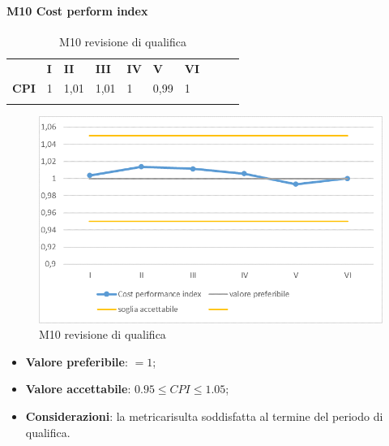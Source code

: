 \paragraph{M10 Cost perform index} \mbox{}
\begin{longtable}[H!] {						
		>{}p{50mm}  		
		>{}p{8mm}
		>{}p{8mm}		
		>{}p{8mm}		
		>{}p{8mm}		
		>{}p{8mm}		
		>{}p{8mm}
		>{}p{8mm}
		>{}p{8mm}
		>{}p{8mm}
	}
	\rowcolor{gray!50}
	\textbf{} & \textbf{I} & \textbf{II} & \textbf{III} & \textbf{IV} & \textbf{V} & \textbf{VI} \TBstrut \\ [2mm]
	\textbf{CPI} & 1 & 1,01 & 1,01 & 1 & 0,99 & 1 \TBstrut \\ [2mm]
	\rowcolor{white}
	\caption{M10 revisione di qualifica}
\end{longtable}
\begin{figure}[H] 	
	\includegraphics[width=\linewidth]{./img/grafici/RQ10.png}	
	\caption{M10 revisione di qualifica}	
\end{figure}
\begin{itemize}
	\item \textbf{Valore preferibile}: $=1$;
	\item \textbf{Valore accettabile}: $0.95 \le CPI \le 1.05$;
	\item \textbf{Considerazioni}: la metrica\glosp risulta soddisfatta al termine del periodo di qualifica.
\end{itemize}

